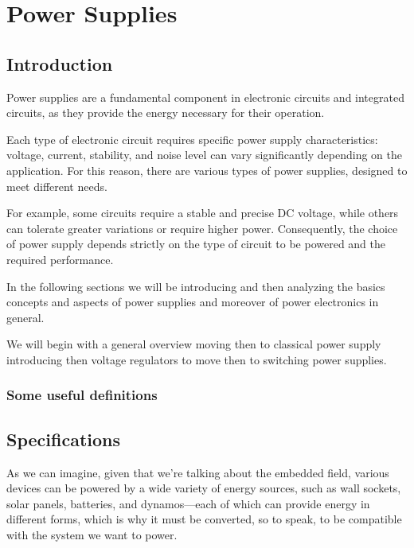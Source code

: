 \documentclass[../main.tex]{subfiles}
\begin{document}
\clearpage
\thispagestyle{empty}

\vspace*{7cm}
\section{Power Supplies}
\vspace*{1.5cm}






\subsection{Introduction}

Power supplies are a fundamental component in electronic circuits and integrated circuits, as they provide the energy necessary for their operation.

Each type of electronic circuit requires specific power supply characteristics: voltage, current, stability, and noise level can vary significantly depending on the application. For this reason, there are various types of power supplies, designed to meet different needs.

For example, some circuits require a stable and precise DC voltage, while others can tolerate greater variations or require higher power. Consequently, the choice of power supply depends strictly on the type of circuit to be powered and the required performance. 

In the following sections we will be introducing and then analyzing the basics concepts and aspects of power supplies and moreover of power electronics in general.

We will begin with a general overview moving then to classical power supply introducing then voltage regulators to move then to switching power supplies.

\subsubsection{Some useful definitions}

\subsection{Specifications}

As we can imagine, given that we’re talking about the embedded field, various devices can be powered by a wide variety of energy sources, such as wall sockets, solar panels, batteries, and dynamos—each of which can provide energy in different forms, which is why it must be converted, so to speak, to be compatible with the system we want to power.  
\end{document}
